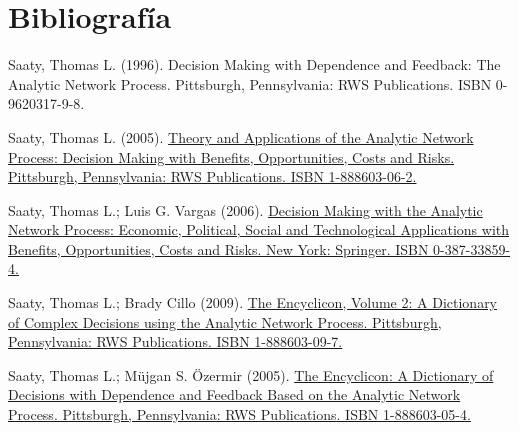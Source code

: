 \documentclass[12pt,letterpaper]{article}
\begin{document}
\section{Bibliografía}
\itemize
\item Saaty, Thomas L. (1996). Decision Making with Dependence and Feedback: The Analytic Network Process. Pittsburgh, Pennsylvania: RWS Publications. ISBN 0-9620317-9-8.
\item Saaty, Thomas L. (2005). \href{http://www.amazon.com/dp/1888603062}{Theory and Applications of the Analytic Network Process: Decision Making with Benefits, Opportunities, Costs and Risks. Pittsburgh, Pennsylvania: RWS Publications. ISBN 1-888603-06-2.}
\item Saaty, Thomas L.; Luis G. Vargas (2006). \href{http://www.amazon.com/dp/0387338594}{Decision Making with the Analytic Network Process: Economic, Political, Social and Technological Applications with Benefits, Opportunities, Costs and Risks. New York: Springer. ISBN 0-387-33859-4.}
\item Saaty, Thomas L.; Brady Cillo (2009). \href{http://rwspublications.com/}{The Encyclicon, Volume 2: A Dictionary of Complex Decisions using the Analytic Network Process. Pittsburgh, Pennsylvania: RWS Publications. ISBN 1-888603-09-7.}
\item Saaty, Thomas L.; Müjgan S. Özermir (2005). \href{http://www.amazon.com/dp/1888603054}{The Encyclicon: A Dictionary of Decisions with Dependence and Feedback Based on the Analytic Network Process. Pittsburgh, Pennsylvania: RWS Publications. ISBN 1-888603-05-4.}
\end{document}
